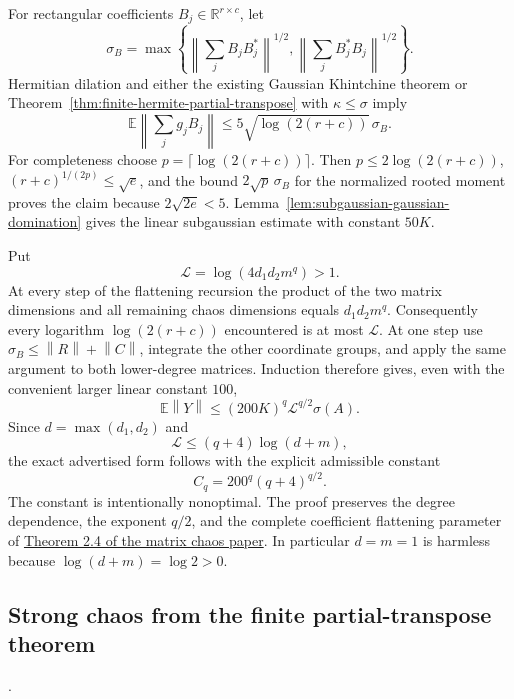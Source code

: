 \documentclass[11pt,a4paper]{article}
\newcommand{\R}{\mathbb R}
\newcommand{\norm}[1]{\left\lVert#1\right\rVert}
\DeclareRobustCommand{\code}[1]{{\footnotesize\urlstyle{tt}\nolinkurl{#1}}}
\begin{document}
For rectangular coefficients $B_j\in\R^{r\times c}$, let
\[
 \sigma_B=\max\left\{\left\|\sum_jB_jB_j^*\right\|^{1/2},
                    \left\|\sum_jB_j^*B_j\right\|^{1/2}\right\}.
\]
Hermitian dilation and either the existing Gaussian Khintchine theorem
or Theorem~\ref{thm:finite-hermite-partial-transpose} with
$\kappa\leq\sigma$ imply
\[
 \mathbb E\norm{\sum_jg_jB_j}
          \leq5\sqrt{\log(2(r+c))}\,\sigma_B.
\]
For completeness choose $p=\lceil\log(2(r+c))\rceil$.  Then
$p\leq2\log(2(r+c))$, $(r+c)^{1/(2p)}\leq\sqrt e$, and the bound
$2\sqrt p\,\sigma_B$ for the normalized rooted moment proves the
claim because $2\sqrt{2e}<5$.
Lemma~\ref{lem:subgaussian-gaussian-domination} gives the linear
subgaussian estimate with constant $50K$.

Put
\[
                  \mathcal L=\log(4d_1d_2m^q)>1.
\]
At every step of the flattening recursion the product of the two matrix
dimensions and all remaining chaos dimensions equals $d_1d_2m^q$.
Consequently every logarithm $\log(2(r+c))$ encountered is at most
$\mathcal L$.  At one step use
$\sigma_B\leq\norm R+\norm C$, integrate the other coordinate groups,
and apply the same argument to both lower-degree matrices.  Induction
therefore gives, even with the convenient larger linear constant $100$,
\[
             \mathbb E\norm Y
       \leq(200K)^q\mathcal L^{q/2}\sigma(A).
\]
Since $d=\max(d_1,d_2)$ and
\[
 \mathcal L\leq(q+4)\log(d+m),
\]
the exact advertised form follows with the explicit admissible constant
\[
                    C_q=200^q(q+4)^{q/2}.
\]
The constant is intentionally nonoptimal.  The proof preserves the
degree dependence, the exponent $q/2$, and the complete coefficient
flattening parameter of
\href{https://arxiv.org/html/2412.18468v2}{Theorem 2.4 of the matrix chaos paper}.
In particular $d=m=1$ is harmless because $\log(d+m)=\log2>0$.

\subsection{Strong chaos from the finite partial-transpose theorem}
\label{route:matrix-chaos-strong-khintchine}
\noindent\code{matrix-chaos-strong-khintchine}.
\end{document}

